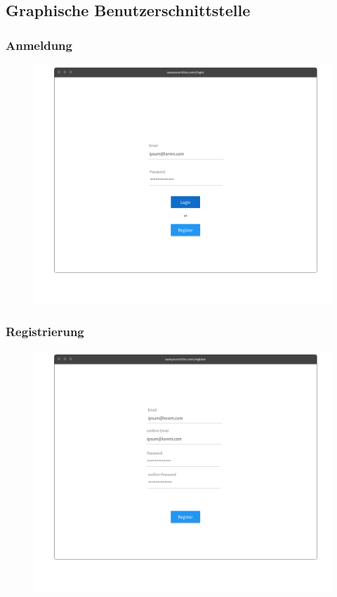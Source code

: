 	\subsection{Graphische Benutzerschnittstelle}
		
		\subsubsection{Anmeldung}
			\begin{figure}[H]
				\includegraphics[scale=0.4]{images/p1}
			\end{figure}
		
		\subsubsection{Registrierung}
			\begin{figure}[H]
				\includegraphics[scale=0.4]{images/p1reg}
			\end{figure}
		
